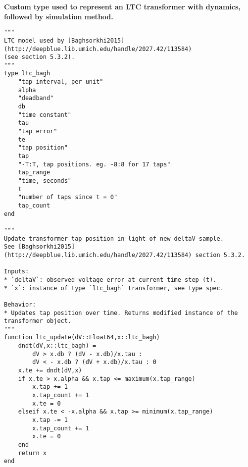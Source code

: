 \documentclass[10pt,letterpaper]{article}
\begin{document}
\textbf{Custom type used to represent an LTC transformer with \cite{baghsorkhi2015} dynamics, followed by simulation method.}
\begin{verbatim}
"""
LTC model used by [Baghsorkhi2015](http://deepblue.lib.umich.edu/handle/2027.42/113584)
(see section 5.3.2).
"""
type ltc_bagh
    "tap interval, per unit"
    alpha
    "deadband"
    db
    "time constant"
    tau
    "tap error"
    te
    "tap position"
    tap
    "-T:T, tap positions. eg. -8:8 for 17 taps"
    tap_range
    "time, seconds"
    t
    "number of taps since t = 0"
    tap_count
end

"""
Update transformer tap position in light of new deltaV sample.
See [Baghsorkhi2015](http://deepblue.lib.umich.edu/handle/2027.42/113584) section 5.3.2.

Inputs:
* `deltaV`: observed voltage error at current time step (t).
* `x`: instance of type `ltc_bagh` transformer, see type spec.

Behavior:
* Updates tap position over time. Returns modified instance of the transformer object.
"""
function ltc_update(dV::Float64,x::ltc_bagh)
    dndt(dV,x::ltc_bagh) =
        dV > x.db ? (dV - x.db)/x.tau :
        dV < - x.db ? (dV + x.db)/x.tau : 0
    x.te += dndt(dV,x)
    if x.te > x.alpha && x.tap <= maximum(x.tap_range)
        x.tap += 1
        x.tap_count += 1
        x.te = 0
    elseif x.te < -x.alpha && x.tap >= minimum(x.tap_range)
        x.tap -= 1
        x.tap_count += 1
        x.te = 0
    end
    return x
end
\end{verbatim}
\end{document}
